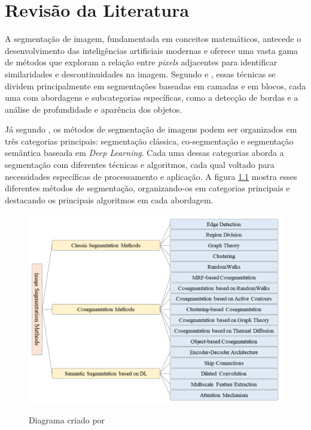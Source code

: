 \chapter{Revisão da Literatura}
\label{cap:02}

A segmentação de imagem, fundamentada em conceitos matemáticos, antecede o desenvolvimento das inteligências artificiais modernas e oferece uma vasta gama de métodos que exploram a relação entre \textit{pixels} adjacentes para identificar similaridades e descontinuidades na imagem. Segundo  e , essas técnicas se dividem principalmente em segmentações baseadas em camadas e em blocos, cada uma com abordagens e subcategorias específicas, como a detecção de bordas e a análise de profundidade e aparência dos objetos.

Já segundo , os métodos de segmentação de imagens podem ser organizados em três categorias principais: segmentação clássica, co-segmentação e segmentação semântica baseada em \textit{Deep Learning}. Cada uma dessas categorias aborda a segmentação com diferentes técnicas e algoritmos, cada qual voltado para necessidades específicas de processamento e aplicação. A figura \ref{fig:segmentacao} mostra esses diferentes métodos de segmentação, organizando-os em categorias principais e destacando os principais algoritmos em cada abordagem.

\FloatBarrier
\begin{figure}[ht]
    \caption{Diagrama criado por }
    \centering
    \includegraphics[scale=0.5]{imagens/metodos_segmentacao.png}
    \label{fig:segmentacao}
\end{figure}
\FloatBarrier

